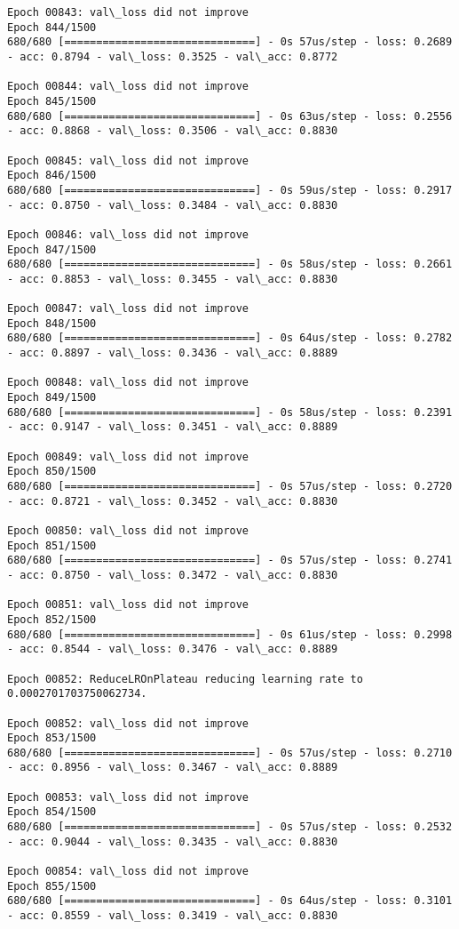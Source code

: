 \documentclass[11pt]{article}
\begin{document}
\begin{Verbatim}[commandchars=\\\{\}]
Epoch 00843: val\_loss did not improve
Epoch 844/1500
680/680 [==============================] - 0s 57us/step - loss: 0.2689 - acc: 0.8794 - val\_loss: 0.3525 - val\_acc: 0.8772

Epoch 00844: val\_loss did not improve
Epoch 845/1500
680/680 [==============================] - 0s 63us/step - loss: 0.2556 - acc: 0.8868 - val\_loss: 0.3506 - val\_acc: 0.8830

Epoch 00845: val\_loss did not improve
Epoch 846/1500
680/680 [==============================] - 0s 59us/step - loss: 0.2917 - acc: 0.8750 - val\_loss: 0.3484 - val\_acc: 0.8830

Epoch 00846: val\_loss did not improve
Epoch 847/1500
680/680 [==============================] - 0s 58us/step - loss: 0.2661 - acc: 0.8853 - val\_loss: 0.3455 - val\_acc: 0.8830

Epoch 00847: val\_loss did not improve
Epoch 848/1500
680/680 [==============================] - 0s 64us/step - loss: 0.2782 - acc: 0.8897 - val\_loss: 0.3436 - val\_acc: 0.8889

Epoch 00848: val\_loss did not improve
Epoch 849/1500
680/680 [==============================] - 0s 58us/step - loss: 0.2391 - acc: 0.9147 - val\_loss: 0.3451 - val\_acc: 0.8889

Epoch 00849: val\_loss did not improve
Epoch 850/1500
680/680 [==============================] - 0s 57us/step - loss: 0.2720 - acc: 0.8721 - val\_loss: 0.3452 - val\_acc: 0.8830

Epoch 00850: val\_loss did not improve
Epoch 851/1500
680/680 [==============================] - 0s 57us/step - loss: 0.2741 - acc: 0.8750 - val\_loss: 0.3472 - val\_acc: 0.8830

Epoch 00851: val\_loss did not improve
Epoch 852/1500
680/680 [==============================] - 0s 61us/step - loss: 0.2998 - acc: 0.8544 - val\_loss: 0.3476 - val\_acc: 0.8889

Epoch 00852: ReduceLROnPlateau reducing learning rate to 0.0002701703750062734.

Epoch 00852: val\_loss did not improve
Epoch 853/1500
680/680 [==============================] - 0s 57us/step - loss: 0.2710 - acc: 0.8956 - val\_loss: 0.3467 - val\_acc: 0.8889

Epoch 00853: val\_loss did not improve
Epoch 854/1500
680/680 [==============================] - 0s 57us/step - loss: 0.2532 - acc: 0.9044 - val\_loss: 0.3435 - val\_acc: 0.8830

Epoch 00854: val\_loss did not improve
Epoch 855/1500
680/680 [==============================] - 0s 64us/step - loss: 0.3101 - acc: 0.8559 - val\_loss: 0.3419 - val\_acc: 0.8830


\end{Verbatim}
\end{document}

